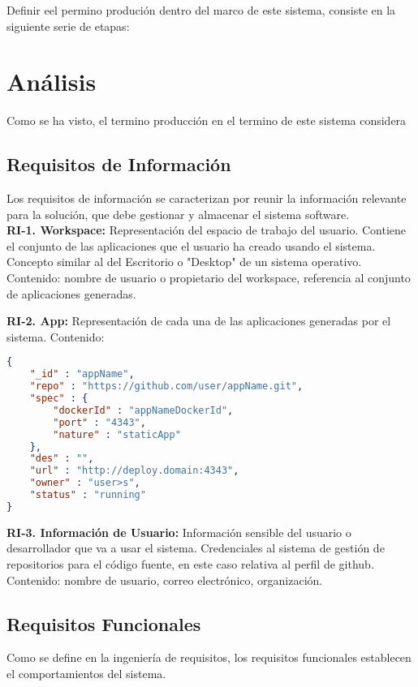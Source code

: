 \documentclass[a4paper,11pt]{book}
\begin{document}
Definir eel permino produción dentro del marco de este sistema, consiste en la siguiente serie de etapas:



\section{Análisis}

Como se ha visto, el termino producción en el termino de este sistema considera 

\subsection{Requisitos de Información }
Los requisitos de información se caracterizan por reunir la información relevante para la solución, que debe gestionar y almacenar el sistema software.\\

\textbf{RI-1. Workspace:} Representación del espacio de trabajo del usuario. Contiene el conjunto de las aplicaciones que el usuario ha creado usando el sistema. Concepto similar al del Escritorio o "Desktop" de un sistema operativo. 
Contenido: nombre de usuario o propietario del workspace, referencia al conjunto de aplicaciones generadas.


\textbf{RI-2. App:} Representación de cada una de las aplicaciones generadas por el sistema. 
Contenido:
\begin{lstlisting}[language=json,firstnumber=1]
{
    "_id" : "appName",
    "repo" : "https://github.com/user/appName.git",
    "spec" : {
        "dockerId" : "appNameDockerId",
        "port" : "4343",
        "nature" : "staticApp"
    },
    "des" : "",
    "url" : "http://deploy.domain:4343",
    "owner" : "user>s",
    "status" : "running"
}
\end{lstlisting}

\textbf{RI-3. Información de Usuario:} Información sensible del usuario o desarrollador que va a usar el sistema. Credenciales al sistema de gestión de repositorios para el código fuente, en este caso relativa al perfil de github. 
Contenido: nombre de usuario, correo electrónico, organización. \\


\subsection{Requisitos Funcionales }
Como se define en la ingeniería de requisitos, los requisitos funcionales establecen el comportamientos del sistema.\\
\end{document}
